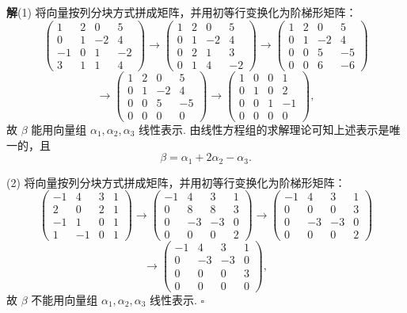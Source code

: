 \documentclass[UTF8,12pt,a4paper,fontset=fandol]{ctexart}
\begin{document}
\noindent\textbf{解}\quad (1) 将向量按列分块方式拼成矩阵，并用初等行变换化为阶梯形矩阵：
\[
\left(
\begin{array}{ccc|c}
1 & 2 & 0 & 5\\
0 & 1 & -2 & 4\\
-1 & 0 & 1 & -2\\
3 & 1 & 1 & 4
\end{array}
\right)
\to
\left(
\begin{array}{ccc|c}
1 & 2 & 0 & 5\\
0 & 1 & -2 & 4\\
0 & 2 & 1 & 3\\
0 & 1 & 4 & -2
\end{array}
\right)
\to
\left(
\begin{array}{ccc|c}
1 & 2 & 0 & 5\\
0 & 1 & -2 & 4\\
0 & 0 & 5 & -5\\
0 & 0 & 6 & -6
\end{array}
\right)
\]
\[
\to
\left(
\begin{array}{ccc|c}
1 & 2 & 0 & 5\\
0 & 1 & -2 & 4\\
0 & 0 & 5 & -5\\
0 & 0 & 0 & 0
\end{array}
\right)
\to
\left(
\begin{array}{ccc|c}
1 & 0 & 0 & 1\\
0 & 1 & 0 & 2\\
0 & 0 & 1 & -1\\
0 & 0 & 0 & 0
\end{array}
\right),
\]
故 $\beta$ 能用向量组 $\alpha_1,\alpha_2,\alpha_3$ 线性表示. 由线性方程组的求解理论可知上述表示是唯一的，且
\[
\beta=\alpha_1+2\alpha_2-\alpha_3.
\]

(2) 将向量按列分块方式拼成矩阵，并用初等行变换化为阶梯形矩阵：
\[
\left(
\begin{array}{ccc|c}
-1 & 4 & 3 & 1\\
2 & 0 & 2 & 1\\
-1 & 1 & 0 & 1\\
1 & -1 & 0 & 1
\end{array}
\right)
\to
\left(
\begin{array}{ccc|c}
-1 & 4 & 3 & 1\\
0 & 8 & 8 & 3\\
0 & -3 & -3 & 0\\
0 & 0 & 0 & 2
\end{array}
\right)
\to
\left(
\begin{array}{ccc|c}
-1 & 4 & 3 & 1\\
0 & 0 & 0 & 3\\
0 & -3 & -3 & 0\\
0 & 0 & 0 & 2
\end{array}
\right)
\]
\[
\to
\left(
\begin{array}{ccc|c}
-1 & 4 & 3 & 1\\
0 & -3 & -3 & 0\\
0 & 0 & 0 & 3\\
0 & 0 & 0 & 0
\end{array}
\right),
\]
故 $\beta$ 不能用向量组 $\alpha_1,\alpha_2,\alpha_3$ 线性表示. $\square$
\end{document}
